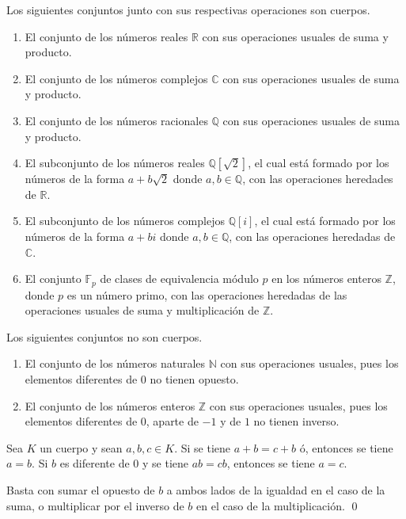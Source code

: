 \begin{ejem}
Los siguientes conjuntos junto con sus respectivas operaciones son cuerpos.
\begin{enumerate}
\item El conjunto de los n\'umeros reales $\mathbb{R}$ con sus operaciones usuales de suma y producto.
\item El conjunto de los n\'umeros complejos $\mathbb{C}$ con sus operaciones usuales de suma y producto.
\item El conjunto de los n\'umeros racionales $\mathbb{Q}$ con sus operaciones usuales de suma y producto.
\item El subconjunto de los n\'umeros reales $\mathbb{Q}[\sqrt{2}]$, el cual est\'a formado por los n\'umeros de la forma $a+b\sqrt{2}$ donde $a,b\in\mathbb{Q}$, con las operaciones heredades de $\mathbb{R}$. 
\item El subconjunto de los n\'umeros complejos $\mathbb{Q}[i]$, el cual est\'a formado por los n\'umeros de la forma $a+bi$ donde $a,b\in\mathbb{Q}$, con las operaciones heredadas de $\mathbb{C}$.
\item El conjunto $\mathbb{F}_p$ de clases de equivalencia m\'odulo $p$ en los n\'umeros enteros $\mathbb{Z}$, donde $p$ es un n\'umero primo, con las operaciones heredadas de las operaciones usuales de suma y multiplicaci\'on de $\mathbb{Z}$.
\end{enumerate}
\end{ejem}

\begin{ejem}
Los siguientes conjuntos no son cuerpos.
\begin{enumerate}
\item El conjunto de los n\'umeros naturales $\mathbb{N}$ con sus operaciones usuales, pues los elementos diferentes de $0$ no tienen opuesto.
\item El conjunto de los n\'umeros enteros $\mathbb{Z}$ con sus operaciones usuales, pues los elementos diferentes de $0$, aparte de $-1$ y de $1$ no tienen inverso.
\end{enumerate}
\end{ejem}

\begin{prop}
Sea $K$ un cuerpo y sean $a,b,c\in K$. Si se tiene $a+b=c+b$ \'o, entonces se tiene $a=b$. Si $b$ es diferente de $0$ y se tiene $ab=cb$, entonces se tiene $a=c$. 
\end{prop}

\dem Basta con sumar el opuesto de $b$ a ambos lados de la igualdad en el caso de la suma, o multiplicar por el inverso de $b$ en el caso de la multiplicaci\'on. \qed

